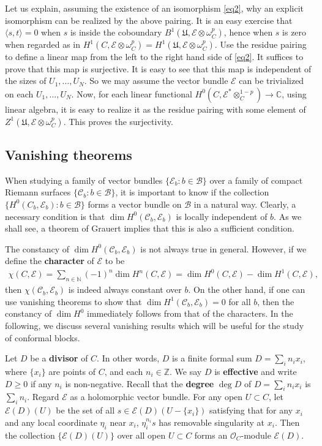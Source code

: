 \documentclass[12pt,b5paper,notitlepage]{report}
\theoremstyle{definition}
\theoremstyle{plain}
\newcommand{\fk}{\mathfrak}
\newcommand{\mc}{\mathcal}
\newcommand{\bk}[1]{\langle {#1}\rangle}
\newcommand{\scr}{\mathscr}
\newcommand{\Cbb}{\mathbb C}
\numberwithin{equation}{section}
\begin{document}
Let us explain, assuming the existence of an isomorphism \eqref{eq2}, why an explicit isomorphism can be realized by the above pairing. It is an easy exercise that $\bk{s,t}=0$ when $s$ is inside the coboundary $B^1(\fk U,\scr E\otimes \omega_C^p)$, hence when $s$ is zero when regarded as in $H^1(C,\scr E\otimes \omega_C^p)=H^1(\fk U,\scr E\otimes \omega_C^p)$. Use the residue pairing to define a linear map from the left to the right hand side of \eqref{eq2}. It suffices to prove that this map is surjective.  It is easy to see that this map is independent of the sizes of $U_1,\dots,U_N$. So we may assume the vector bundle $\scr E$ can be trivialized on each $U_1,\dots,U_N$. Now, for each linear functional $H^0(C,\scr E^*\otimes_C^{1-p})\rightarrow\Cbb$,  using linear algebra, it is easy to realize it as the residue pairing with some element of $Z^1(\fk U,\scr E\otimes\omega_C^p)$. This proves the surjectivity. 


\subsection*{Vanishing theorems} 



When studying a family of vector bundles $\{\scr E_b:b\in\mc B \}$ over a family of compact Riemann surfaces $\{\mc C_b:b\in\mc B \}$, it is important to know if the collection $\{H^0(C_b,\scr E_b):b\in\mc B\}$ forms a vector bundle on $\mc B$ in a natural way.  Clearly, a necessary condition is that  $\dim H^0(\mc C_b,\scr E_b)$ is locally independent of $b$. As we shall see, a theorem of Grauert implies that this is also a sufficient condition.

The constancy of $\dim H^0(\mc C_b,\scr E_b)$ is not always true in general. However, if we define the \textbf{character} of $\scr E$ to be \index{zz@$\chi(C,\scr E)$}
\begin{align}
\chi(C,\scr E)=\sum_{n\in\mathbb N}(-1)^n\dim H^n(C,\scr E)=\dim H^0(C,\scr E)-\dim H^1(C,\scr E),\label{eq13}
\end{align}
then $\chi(\mc C_b,\scr E_b)$ is indeed always constant over $b$. On the other hand, if one can use vanishing theorems to show that $\dim H^1(\mc C_b,\scr E_b)=0$ for all $b$, then the constancy of $\dim H^0$ immediately follows from that of the characters. In the following, we discuss several vanishing results which will be useful for the study of conformal blocks.

Let $D$ be a \textbf{divisor} of $C$. In other words, $D$ is a finite formal sum $D=\sum_i n_ix_i$, where $\{x_i\}$ are  points of $C$, and each $n_i\in\mathbb Z$. We say $D$ is \textbf{effective} and write $D\geq 0$ if any $n_i$ is non-negative.  Recall that the \textbf{degree} $\deg D$ of $D=\sum_i n_ix_i$ is $\sum_i n_i$.    Regard $\scr E$ as a holomorphic vector bundle. For any open $U\subset C$, let $\scr E(D)(U)$ be the set of all $s\in \scr E(D)(U-\{x_i\})$  satisfying that for any $x_i$ and any local coordinate $\eta_i$ near $x_i$, $\eta_i^{n_i}s$ has removable singularity at $x_i$. Then the collection $\{\scr E(D)(U) \}$ over all open $U\subset C$ forms an $\scr O_C$-module $\scr E(D)$. \index{ED@$\scr E(D),\scr O_C(D)$}
\end{document}
